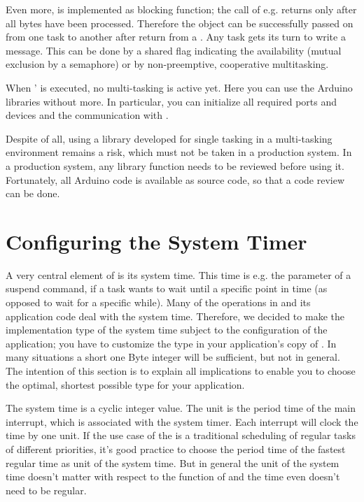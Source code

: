 Even more,  is implemented as blocking function; the call of
e.g.  returns only after all bytes have been processed.
Therefore the object can be successfully passed on from one task to another
after return from a . Any task gets its turn to write a
message. This can be done by a shared flag indicating the availability
(mutual exclusion by a semaphore) or by non-preemptive, cooperative
multitasking.

When \rtos{}'  is executed, no multi-tasking is active yet.
Here you can use the Arduino libraries without more. In particular, you can
initialize all required ports and devices and the communication with
. 

Despite of all, using a library developed for single tasking in a
multi-tasking environment remains a risk, which must not be taken in a
production system. In a production system, any library function needs to
be reviewed before using it. Fortunately, all Arduino code is available as
source code, so that a code review can be done.



\section{Configuring the System Timer}
\label{secSystemTimer}

A very central element of \rtos{} is its system time. This time is e.g.
the parameter of a suspend command, if a task wants to wait until a
specific point in time (as opposed to wait for a specific while). Many of
the operations in \rtos{} and its application code deal with the system
time. Therefore, we decided to make the implementation type of the system
time subject to the configuration of the application; you have to
customize the type in your application's copy of . In
many situations a short one Byte integer will be sufficient, but not in
general. The intention of this section is to explain all implications to
enable you to choose the optimal, shortest possible type for your
application.

The system time is a cyclic integer value. The unit is the period time of
the main interrupt, which is associated with the system timer. Each
interrupt will clock the time by one unit. If the use case of the \rtos{}
is a traditional scheduling of regular tasks of different priorities, it's
good practice to choose the period time of the fastest regular time as
unit of the system time. But in general the unit of the system time
doesn't matter with respect to the function of \rtos{} and the time even
doesn't need to be regular.

